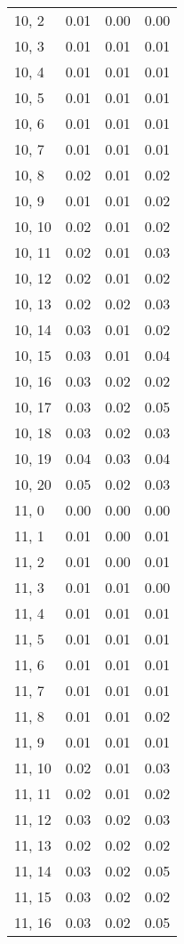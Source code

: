 \begin{table}
\begin{tabular}{llll}
10, 2  &  0.01 &  0.00 &  0.00 \\
10, 3  &  0.01 &  0.01 &  0.01 \\
10, 4  &  0.01 &  0.01 &  0.01 \\
10, 5  &  0.01 &  0.01 &  0.01 \\
10, 6  &  0.01 &  0.01 &  0.01 \\
10, 7  &  0.01 &  0.01 &  0.01 \\
10, 8  &  0.02 &  0.01 &  0.02 \\
10, 9  &  0.01 &  0.01 &  0.02 \\
10, 10 &  0.02 &  0.01 &  0.02 \\
10, 11 &  0.02 &  0.01 &  0.03 \\
10, 12 &  0.02 &  0.01 &  0.02 \\
10, 13 &  0.02 &  0.02 &  0.03 \\
10, 14 &  0.03 &  0.01 &  0.02 \\
10, 15 &  0.03 &  0.01 &  0.04 \\
10, 16 &  0.03 &  0.02 &  0.02 \\
10, 17 &  0.03 &  0.02 &  0.05 \\
10, 18 &  0.03 &  0.02 &  0.03 \\
10, 19 &  0.04 &  0.03 &  0.04 \\
10, 20 &  0.05 &  0.02 &  0.03 \\
11, 0  &  0.00 &  0.00 &  0.00 \\
11, 1  &  0.01 &  0.00 &  0.01 \\
11, 2  &  0.01 &  0.00 &  0.01 \\
11, 3  &  0.01 &  0.01 &  0.00 \\
11, 4  &  0.01 &  0.01 &  0.01 \\
11, 5  &  0.01 &  0.01 &  0.01 \\
11, 6  &  0.01 &  0.01 &  0.01 \\
11, 7  &  0.01 &  0.01 &  0.01 \\
11, 8  &  0.01 &  0.01 &  0.02 \\
11, 9  &  0.01 &  0.01 &  0.01 \\
11, 10 &  0.02 &  0.01 &  0.03 \\
11, 11 &  0.02 &  0.01 &  0.02 \\
11, 12 &  0.03 &  0.02 &  0.03 \\
11, 13 &  0.02 &  0.02 &  0.02 \\
11, 14 &  0.03 &  0.02 &  0.05 \\
11, 15 &  0.03 &  0.02 &  0.02 \\
11, 16 &  0.03 &  0.02 &  0.05 \\

\end{tabular}
\end{table}
